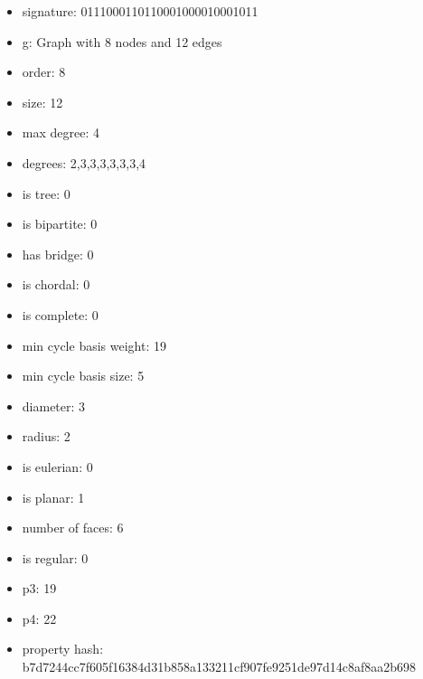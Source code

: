 \begin{itemize}
\item signature: 0111000110110001000010001011
\item g: Graph with 8 nodes and 12 edges
\item order: 8
\item size: 12
\item max degree: 4
\item degrees: 2,3,3,3,3,3,3,4
\item is tree: 0
\item is bipartite: 0
\item has bridge: 0
\item is chordal: 0
\item is complete: 0
\item min cycle basis weight: 19
\item min cycle basis size: 5
\item diameter: 3
\item radius: 2
\item is eulerian: 0
\item is planar: 1
\item number of faces: 6
\item is regular: 0
\item p3: 19
\item p4: 22
\item property hash: b7d7244cc7f605f16384d31b858a133211cf907fe9251de97d14c8af8aa2b698
\end{itemize}
\newpage
\begin{figure}
\end{figure}
